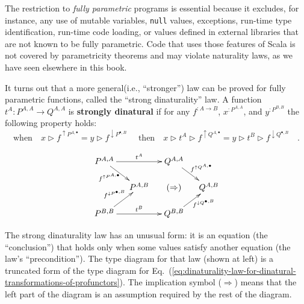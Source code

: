 The restriction to \emph{fully parametric} programs
is essential because it excludes, for instance, any use of mutable
variables, \lstinline!null! values, exceptions, run-time type identification,
run-time code loading, or values defined in external libraries that
are not known to be fully parametric. Code that uses those features
of Scala is not covered by parametricity theorems and may violate
naturality laws, as we have seen elsewhere in this book.

It turns out that a more general(i.e., \textsf{``}stronger\textsf{''}) law can be
proved for fully parametric functions, called the \textsf{``}strong dinaturality\textsf{''}
law. A function $t^{A}:P^{A,A}\rightarrow Q^{A,A}$
is \textbf{strongly dinatural} if for any $f^{:A\rightarrow B}$,
$x^{:P^{A,A}}$, and $y^{:P^{B,B}}$ the following property holds:
\begin{equation}
\text{when}\quad x\triangleright f^{\uparrow P^{A,\bullet}}=y\triangleright f^{\downarrow P^{\bullet,B}}\quad\text{ then}\quad x\triangleright t^{A}\triangleright f^{\uparrow Q^{A,\bullet}}=y\triangleright t^{B}\triangleright f^{\downarrow Q^{\bullet,B}}\quad.\label{eq:strong-dinaturality-law}
\end{equation}

\begin{wrapfigure}{l}{0.32\columnwidth}%
\vspace{-2.3\baselineskip}

\[
\xymatrix{\xyScaleY{1.2pc}\xyScaleX{1.0pc}P^{A,A}\ar[rd]\sb(0.35){f^{\uparrow P^{A,\bullet}}\!\!\!}\ar[rr]\sp(0.5){t^{A}} &  & Q^{A,A}\ar[rd]\sp(0.5){f^{\uparrow Q^{A,\bullet}}}\\
 & P^{A,B} & (\Rightarrow) & Q^{A,B}\\
P^{B,B}\ar[ru]\sp(0.5){f^{\downarrow P^{\bullet,B}}\!\!\!}\ar[rr]\sp(0.5){t^{B}} &  & Q^{B,B}\ar[ru]\sb(0.65){\!\!\!f^{\downarrow Q^{\bullet,B}}}
}
\]
\vspace{-2\baselineskip}
\end{wrapfigure}%

\noindent The strong dinaturality law has an unusual form: it is an
equation (the \textsf{``}conclusion\textsf{''}) that holds only when some values satisfy
another equation (the law\textsf{'}s \textsf{``}precondition\textsf{''}). The type diagram
for that law (shown at left) is a truncated form of the type diagram
for Eq.~(\ref{eq:dinaturality-law-for-dinatural-transformations-of-profunctors}).
The implication symbol ($\Rightarrow$) means that the left part of
the diagram is an assumption required by the rest of the diagram. 

